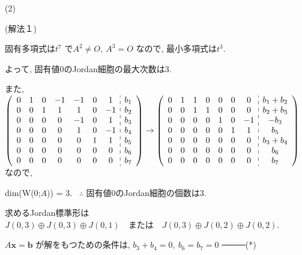 \documentclass{jsarticle}
\begin{document}
\bigskip
\bigskip

(2)

(解法１)

固有多項式は$t^7$ で$A^2 \neq O , \ A^3 = O$ なので, 最小多項式は$t^3$. 

よって, 固有値$0$のJordan細胞の最大次数は$3$. 

また, 
$
\left(\begin{array}{ccccccc:c}
0 & 1 & 0 & -1 & -1 & 0 & 1 & b_1 \\
0 & 0 & 1 & 1 & 1 & 0 & -1 & b_2 \\
0 & 0 & 0 & 0 & -1 & 0 & 1 & b_3 \\
0 & 0 & 0 & 0 & 1 & 0 & -1 & b_4 \\
0 & 0 & 0 & 0 & 0 & 1 & 1 & b_5 \\
0 & 0 & 0 & 0 & 0 & 0 & 0 & b_6 \\
0 & 0 & 0 & 0 & 0 & 0 & 0 & b_7
\end{array}\right) \rightarrow\left(\begin{array}{ccccccc:c}
0 & 1 & 1 & 0 & 0 & 0 & 0 & b_1+b_2 \\
0 & 0 & 1 & 1 & 0 & 0 & 0 & b_2+b_3 \\
0 & 0 & 0 & 0 & 1 & 0 & -1 & -b_3 \\
0 & 0 & 0 & 0 & 0 & 1 & 1 & b_5 \\
0 & 0 & 0 & 0 & 0 & 0 & 0 & b_3+b_4 \\
0 & 0 & 0 & 0 & 0 & 0 & 0 & b_6 \\
0 & 0 & 0 & 0 & 0 & 0 & 0 & b_7
\end{array}\right)
$
なので, 

\bigskip

dim(W(0;$A$)) = $3$. \ $\therefore$ 固有値$0$のJordan細胞の個数は$3$.

求めるJordan標準形は
$J(0,3) \oplus J(0,3) \oplus J(0,1) \quad または \quad J(0,3) \oplus J(0,2) \oplus J(0,2)$.

$A\bm{x} = \bm{b}$ が解をもつための条件は, $b_3+b_4 = 0, \ b_6=b_7=0$ ────(*)
\end{document}
